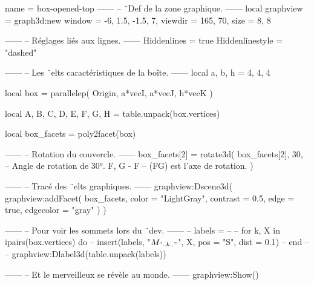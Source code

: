 \documentclass{standalone}
\begin{document}
\begin{luadraw}{name = box-opened-top}
------
-- ¨Def de la zone graphique.
------
local graphview = graph3d:new{
  window  = {-6, 1.5, -1.5, 7},
  viewdir = {165, 70},
  size    = {8, 8}
}

------
-- Réglages liés aux lignes.
------
Hiddenlines     = true
Hiddenlinestyle = "dashed"

------
-- Les ¨elts caractéristiques de la boîte.
------
local a, b, h = 4, 4, 4

local box = parallelep(
  Origin,
  a*vecI, a*vecJ, h*vecK
)

local A, B, C, D, E, F, G, H = table.unpack(box.vertices)

local box_facets = poly2facet(box)

------
-- Rotation du couvercle.
------
box_facets[2] = rotate3d(
  box_facets[2],
  30,         -- Angle de rotation de 30°.
  {F, G - F}  -- (FG) est l'axe de rotation.
)

------
-- Tracé des ¨elts graphiques.
------
graphview:Dscene3d(
  graphview:addFacet(
    box_facets,
    {
      color     = "LightGray",
      contrast  = 0.5,
      edge      = true,
      edgecolor = "gray"
    })
)

------
-- Pour voir les sommets lors du ¨dev.
------
-- labels = {}
--
-- for k, X in ipairs(box.vertices) do
--   insert(labels, {"$M_{".. k .."}$", X, {pos = "S", dist = 0.1}})
-- end
--
-- graphview:Dlabel3d(table.unpack(labels))

------
-- Et le merveilleux se révèle au monde.
------
graphview:Show()
\end{luadraw}
\end{document}
